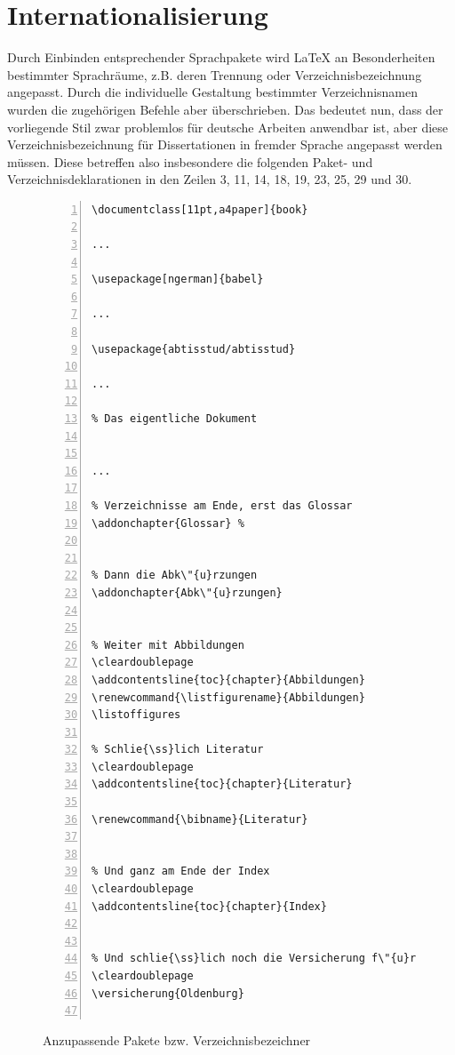 \section{Internationalisierung}
Durch Einbinden entsprechender Sprachpakete wird \LaTeX{} an
Besonderheiten bestimmter Sprachr\"{a}ume, z.B. deren Trennung oder
Verzeichnisbezeichnung angepasst. Durch die individuelle
Gestaltung bestimmter Verzeichnisnamen wurden die zugeh\"{o}rigen
Befehle aber \"{u}berschrieben. Das bedeutet nun, dass der vorliegende
Stil zwar problemlos f\"{u}r deutsche Arbeiten anwendbar ist, aber
diese Verzeichnisbezeichnung f\"{u}r Dissertationen in fremder Sprache
angepasst werden m\"{u}ssen. Diese betreffen also insbesondere die
folgenden Paket- und Verzeichnisdeklarationen in den Zeilen 3, 11,
14, 18, 19, 23, 25, 29 und 30.

\begin{figure}[htp]
\centering
\begin{Verbatim}[label=dissertation.tex,numberblanklines=false,fontsize=\scriptsize,numbers=left,frame=single]
\documentclass[11pt,a4paper]{book}

...

\usepackage[ngerman]{babel}

...

\usepackage{abtisstud/abtisstud}

...

% Das eigentliche Dokument


...

% Verzeichnisse am Ende, erst das Glossar
\addonchapter{Glossar} %


% Dann die Abk\"{u}rzungen
\addonchapter{Abk\"{u}rzungen}


% Weiter mit Abbildungen
\cleardoublepage
\addcontentsline{toc}{chapter}{Abbildungen}
\renewcommand{\listfigurename}{Abbildungen}
\listoffigures

% Schlie{\ss}lich Literatur
\cleardoublepage
\addcontentsline{toc}{chapter}{Literatur}

\renewcommand{\bibname}{Literatur}


% Und ganz am Ende der Index
\cleardoublepage
\addcontentsline{toc}{chapter}{Index}


% Und schlie{\ss}lich noch die Versicherung f\"{u}r das Pr\"{u}fungsamt
\cleardoublepage
\versicherung{Oldenburg}


\end{Verbatim}
\caption{Anzupassende Pakete bzw. Verzeichnisbezeichner}\label{verzeichnisanpassung}
\end{figure}




